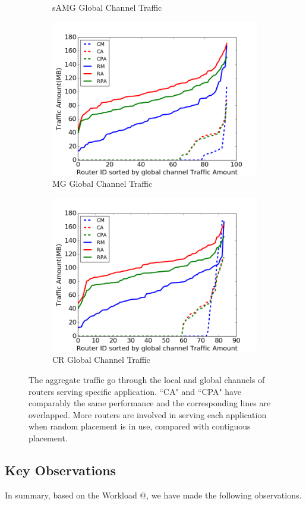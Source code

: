 \documentclass[conference,compsoc]{IEEEtran}
\makeatletter
\newcommand{\Rmnum}[1]{\expandafter\@slowromancap\romannumeral #1@}
\makeatother
\begin{document}
\begin{figure}[t]
\begin{subfigure}[t]{0.32\textwidth}
        \caption{sAMG Global Channel Traffic}
        \label{fig:syn-samg-gc-traffic}
    \end{subfigure}\hfill
    \hspace{1em}%
    \begin{subfigure}[t]{0.32\textwidth}
        \centering
        \includegraphics[height=1.5 in]{syn-wkld/mg/gc-traffic}
        \caption{MG Global Channel Traffic}
        \label{fig:syn-mg-gc-traffic}
    \end{subfigure}\hfill
    \begin{subfigure}[t]{0.32\textwidth}
        \centering
        \includegraphics[height=1.5 in]{syn-wkld/cr/gc-traffic}
        \caption{CR Global Channel Traffic}
        \label{fig:syn-cr-gc-traffic}
    \end{subfigure}%
   \caption{The aggregate traffic go through the local and global channels of routers serving specific application. ``CA" and ``CPA" have comparably the same performance and the corresponding lines are overlapped. More routers are involved in serving each application when random placement is in use, compared with contiguous placement.}
   \label{fig:syn-3app-gc-traffic}
\end{figure}


\subsection{Key Observations}

In summary, based on the Workload \Rmnum{2}, we have made the following observations.

\end{document}
